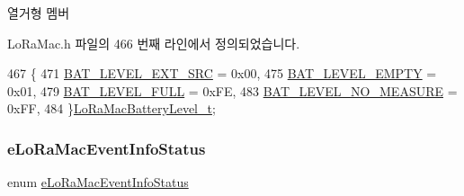 \begin{DoxyEnumFields}{열거형 멤버}
\end{DoxyEnumFields}


Lo\+Ra\+Mac.\+h 파일의 466 번째 라인에서 정의되었습니다.


\begin{DoxyCode}
467 \{
471     \mbox{\hyperlink{group___l_o_r_a_m_a_c_ggac7cbd1d9dc906cf2b33e3715cdd426c3ab2585bfe30f5bf5b5eee079ed2239cf4}{BAT\_LEVEL\_EXT\_SRC}}                = 0x00,
475     \mbox{\hyperlink{group___l_o_r_a_m_a_c_ggac7cbd1d9dc906cf2b33e3715cdd426c3aa350120effa2360e583ad6e91704b067}{BAT\_LEVEL\_EMPTY}}                  = 0x01,
479     \mbox{\hyperlink{group___l_o_r_a_m_a_c_ggac7cbd1d9dc906cf2b33e3715cdd426c3a72005e8306adb99b1398ff2c6817e6b9}{BAT\_LEVEL\_FULL}}                   = 0xFE,
483     \mbox{\hyperlink{group___l_o_r_a_m_a_c_ggac7cbd1d9dc906cf2b33e3715cdd426c3a74b9377d8f67a38ad73ce627ba610b55}{BAT\_LEVEL\_NO\_MEASURE}}             = 0xFF,
484 \}\mbox{\hyperlink{group___l_o_r_a_m_a_c_ga05ad2aa3ef6de09ab289684a26901f75}{LoRaMacBatteryLevel\_t}};
\end{DoxyCode}
\mbox{\label{group___l_o_r_a_m_a_c_ga3c4e7a774e25faf1606f577ee5e7d201}} 
\subsubsection{\texorpdfstring{e\+Lo\+Ra\+Mac\+Event\+Info\+Status}{eLoRaMacEventInfoStatus}}
{\footnotesize\ttfamily enum \mbox{\hyperlink{group___l_o_r_a_m_a_c_ga3c4e7a774e25faf1606f577ee5e7d201}{e\+Lo\+Ra\+Mac\+Event\+Info\+Status}}}

